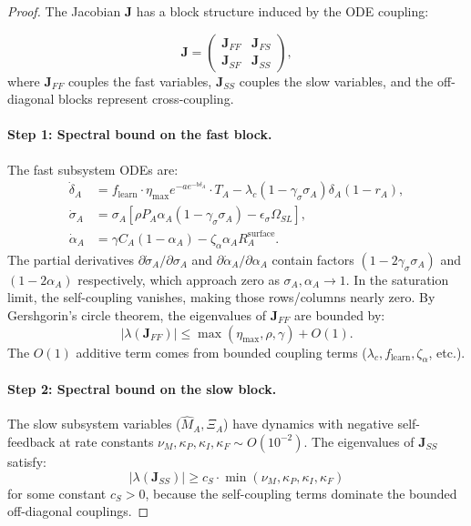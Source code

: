 \begin{proof}
The Jacobian $\mathbf{J}$ has a block structure induced by the
ODE coupling:

\[
\mathbf{J} =
\begin{pmatrix}
\mathbf{J}_{FF} & \mathbf{J}_{FS} \\
\mathbf{J}_{SF} & \mathbf{J}_{SS}
\end{pmatrix},
\]
where $\mathbf{J}_{FF}$ couples the fast variables, $\mathbf{J}_{SS}$
couples the slow variables, and the off-diagonal blocks represent
cross-coupling.

\paragraph{Step 1: Spectral bound on the fast block.}
The fast subsystem ODEs are:
\begin{align*}
\dot{\delta}_A &= f_{\text{learn}} \cdot \eta_{\max} e^{-a e^{-b\delta_A}} \cdot T_A
- \lambda_c (1 - \gamma_\sigma \sigma_A) \delta_A (1 - r_A), \\
\dot{\sigma}_A &= \sigma_A [\rho P_A \alpha_A (1 - \gamma_\sigma \sigma_A)
- \epsilon_\sigma \Omega_{SL}], \\
\dot{\alpha}_A &= \gamma C_A (1 - \alpha_A) - \zeta_\alpha \alpha_A R_A^{\text{surface}}.
\end{align*}
The partial derivatives $\partial \dot{\sigma}_A / \partial \sigma_A$ and
$\partial \dot{\alpha}_A / \partial \alpha_A$ contain factors
$(1 - 2\gamma_\sigma \sigma_A)$ and $(1 - 2\alpha_A)$ respectively,
which approach zero as $\sigma_A, \alpha_A \to 1$. In the saturation
limit, the self-coupling vanishes, making those rows/columns nearly
zero. By Gershgorin's circle theorem, the eigenvalues of $\mathbf{J}_{FF}$
are bounded by:
\[
|\lambda(\mathbf{J}_{FF})| \leq \max(\eta_{\max}, \rho, \gamma) + O(1).
\]
The $O(1)$ additive term comes from bounded coupling terms
($\lambda_c, f_{\text{learn}}, \zeta_\alpha$, etc.).

\paragraph{Step 2: Spectral bound on the slow block.}
The slow subsystem variables ($\hat{M}_A, \Xi_A$) have dynamics with
negative self-feedback at rate constants $\nu_M, \kappa_P, \kappa_I,
\kappa_F \sim O(10^{-2})$. The eigenvalues of $\mathbf{J}_{SS}$ satisfy:
\[
|\lambda(\mathbf{J}_{SS})| \geq c_S \cdot \min(\nu_M, \kappa_P, \kappa_I, \kappa_F)
\]
for some constant $c_S > 0$, because the self-coupling terms dominate
the bounded off-diagonal couplings.


\end{proof}
